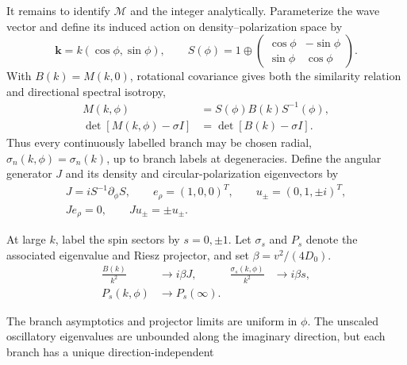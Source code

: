 \documentclass[aps,prl,reprint,superscriptaddress,nofootinbib,floatfix]{revtex4-2}
\begin{document}
It remains to identify $\mathcal M$ and the integer analytically. Parameterize the wave vector and define its induced action on density--polarization space by
\begin{equation}
  \mathbf k=k(\cos\phi,\sin\phi),\qquad
  S(\phi)=1\oplus
  \begin{pmatrix}
    \cos\phi&-\sin\phi\\
    \sin\phi&\cos\phi
  \end{pmatrix}.
  \label{eq:prl_rotation}
\end{equation}
With $B(k)=M(k,0)$, rotational covariance gives both the similarity relation and directional spectral isotropy,
\begin{equation}
  \begin{aligned}
  M(k,\phi)&=S(\phi)B(k)S^{-1}(\phi),\\
  \det[M(k,\phi)-\sigma I]&=\det[B(k)-\sigma I].
  \end{aligned}
  \label{eq:prl_covariance}
\end{equation}
Thus every continuously labelled branch may be chosen radial,
$\sigma_n(k,\phi)=\sigma_n(k)$, up to branch labels at degeneracies. Define
the angular generator $J$ and its density and circular-polarization
eigenvectors by
\begin{equation}
  \begin{gathered}
  J=iS^{-1}\partial_\phi S,\qquad
  e_\rho=(1,0,0)^T,\qquad u_\pm=(0,1,\pm i)^T,\\
  Je_\rho=0,\qquad Ju_\pm=\pm u_\pm .
  \end{gathered}
  \label{eq:prl_spin_basis}
\end{equation}
\begin{samepage}
At large $k$, label the spin sectors by $s=0,\pm1$. Let $\sigma_s$ and
$P_s$ denote the associated eigenvalue and Riesz projector, and set
$\beta=v^2/(4D_0)$.
\begin{equation}
  \begin{aligned}
  \frac{B(k)}{k^2}&\longrightarrow i\beta J,
  &\frac{\sigma_s(k,\phi)}{k^2}&\longrightarrow i\beta s,\\
  P_s(k,\phi)&\longrightarrow P_s(\infty).
  \end{aligned}
  \label{eq:prl_infinity_data}
\end{equation}
\end{samepage}
The branch asymptotics and projector limits are uniform in $\phi$. The unscaled oscillatory eigenvalues are unbounded along
the imaginary direction, but each branch has a unique direction-independent
\end{document}
